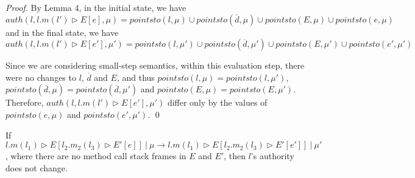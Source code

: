 \documentclass{llncs}
\begin{document}
\begin{proof} By Lemma 4, in the initial state, we have
\[
auth(l, l.m(l') \rhd E[e], \mu) = pointsto(l, \mu) \cup pointsto(\overline{d}, \mu) \cup pointsto(E, \mu) \cup pointsto(e, \mu)
\]
and in the final state, we have
\[
auth(l, l.m(l') \rhd E[e'], \mu') = pointsto(l, \mu') \cup pointsto(\overline{d}, \mu') \cup pointsto(E, \mu') \cup pointsto(e', \mu')
\]

Since we are considering small-step semantics, within this evaluation step, there were no changes to $l$, $\overline{d}$ and $E$, and thus $pointsto(l, \mu) = pointsto(l, \mu')$, $pointsto(\overline{d}, \mu) = pointsto(\overline{d}, \mu')$ and $pointsto(E, \mu) = pointsto(E, \mu')$. Therefore, $auth(l, l.m(l') \rhd E[e'], \mu')$ differ only by the values of $pointsto(e, \mu)$ and $pointsto(e', \mu')$. \qed

\end{proof}

\newpage
\begin{lemma}
If 
\mbox{$l.m(l_1) \rhd E[l_2.m_2(l_3) \rhd E'[e]]~|~\mu \longrightarrow l.m(l_1) \rhd E[l_2.m_2(l_3) \rhd E'[e']]~|~\mu'$}, where there are no method call stack frames in $E$ and $E'$, then $l$'s authority does not change.
\end{lemma}
\end{document}
